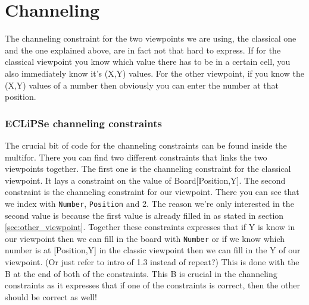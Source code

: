 \documentclass{report}
\begin{document}
\section{Channeling}
The channeling constraint for the two viewpoints we are using, the classical one and the one explained above, are in fact not that hard to express. If for the classical viewpoint you know which value there has to be in a certain cell, you also immediately know it's (X,Y) values. For the other viewpoint, if you know the (X,Y) values of a number then obviously you can enter the number at that position. 

\subsubsection{ECLiPSe channeling constraints}

	The crucial bit of code for the channeling constraints can be found inside the multifor. There you can find two different constraints that links the two viewpoints together. The first one is the channeling constraint for the classical viewpoint. It lays a constraint on the value of Board[Position,Y]. The second constraint is the channeling constraint for our viewpoint. There you can see that we index with \texttt{Number}, \texttt{Position} and 2. The reason we're only interested in the second value is because the first value is already filled in as stated in section \ref{sec:other_viewpoint}. Together these constraints expresses that if Y is know in our viewpoint then we can fill in the board with \texttt{Number} or if we know which number is at [Position,Y] in the classic viewpoint then we can fill in the Y of our viewpoint. (Or just refer to intro of 1.3 instead of repeat?) This is done with the B at the end of both of the constraints. This B is crucial in the channeling constraints as it expresses that if one of the constraints is correct, then the other should be correct as well!
	
\newpage
\end{document}
